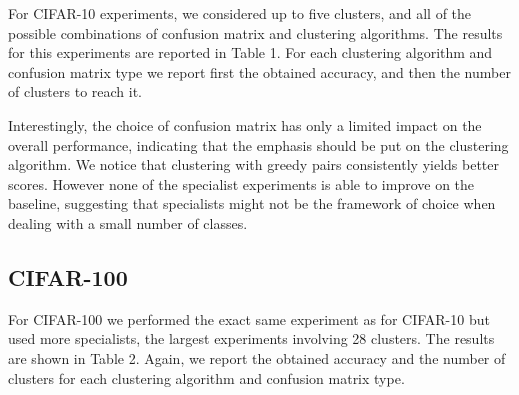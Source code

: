 \documentclass[12pt]{article}
\begin{document}
For CIFAR-10 experiments, we considered up to five clusters, and all of the
possible combinations of confusion matrix and clustering algorithms. The
results for this experiments are reported in Table 1. For each clustering
algorithm and confusion matrix type we report first the obtained accuracy, and
then the number of clusters to reach it.



Interestingly, the choice of confusion matrix has only a limited impact
on the overall performance, indicating that the emphasis should be put
on the clustering algorithm. We notice that clustering with greedy pairs
consistently yields better scores. However none of the specialist
experiments is able to improve on the baseline, suggesting that
specialists might not be the framework of choice when dealing with a
small number of classes.

\subsection{CIFAR-100}\label{cifar-100}

For CIFAR-100 we performed the exact same experiment as for CIFAR-10 but used
more specialists, the largest experiments involving 28 clusters. The results
are shown in Table 2. Again, we report the obtained accuracy and the number of
clusters for each clustering algorithm and confusion matrix type.
\end{document}
